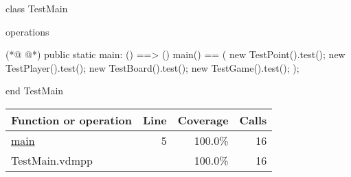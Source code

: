 \begin{vdmpp}[breaklines=true]
class TestMain

operations
 
(*@
\label{main:5}
@*)
 public static main: () ==> ()
 main() ==
 (
  new TestPoint().test();
  new TestPlayer().test();
  new TestBoard().test();
  new TestGame().test();
 );

end TestMain
\end{vdmpp}
\bigskip
\begin{longtable}{|l|r|r|r|}
\hline
Function or operation & Line & Coverage & Calls \\
\hline
\hline
\hyperref[main:5]{main} & 5&100.0\% & 16 \\
\hline
\hline
TestMain.vdmpp & & 100.0\% & 16 \\
\hline
\end{longtable}

